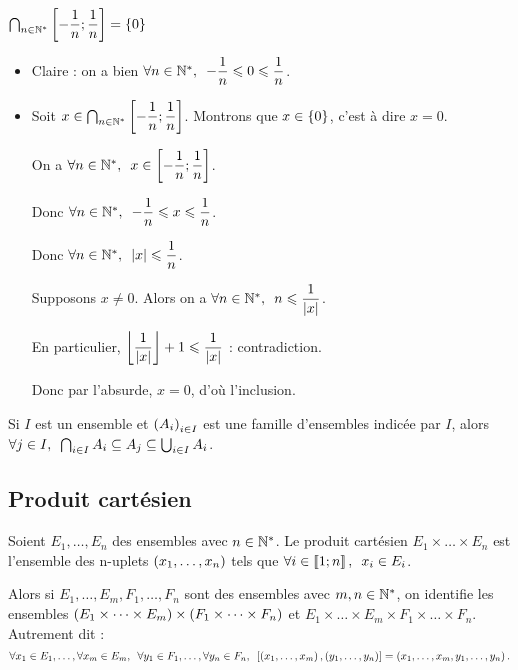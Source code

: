 \begin{ex}~\\
\(\bigcap_{n\in\mathbb{N}^*}\left[-\dfrac{1}{n};\dfrac{1}{n}\right]=\left\lbrace0\right\rbrace\)
\end{ex}

\begin{dem}
\begin{itemize}
\item[\increc] Claire : on a bien \(\quantifs{\forall n\in\Ns}-\dfrac{1}{n}\leq0\leq\dfrac{1}{n}\).

\item[\incdir] Soit \(x\in\bigcap_{n\in\mathbb{N}^*}\left[-\dfrac{1}{n};\dfrac{1}{n}\right]\). Montrons que \(x\in\left\lbrace0\right\rbrace\), c'est à dire \(x=0\).

On a \(\quantifs{\forall n\in\Ns}x\in\intervii{-\dfrac{1}{n}}{\dfrac{1}{n}}\).

Donc \(\quantifs{\forall n\in\Ns}-\dfrac{1}{n}\leq x\leq\dfrac{1}{n}\).

Donc \(\quantifs{\forall n\in\Ns}\abs{x}\leq\dfrac{1}{n}\).

Supposons \(x\not=0\). Alors on a \(\quantifs{\forall n\in\Ns}n\leq\dfrac{1}{\abs{x}}\).

En particulier, \(\left\lfloor\dfrac{1}{\left\lvert x\right\rvert}\right\rfloor+1\leqslant\dfrac{1}{\left\lvert x\right\rvert}\) : contradiction.

Donc par l'absurde, \(x=0\), d'où l'inclusion.
\end{itemize}
\end{dem}

\begin{rem}
Si \(I\) est un ensemble et \(\left(A_i\right)_{i\in I}\) est une famille d'ensembles indicée par \(I\), alors \(\quantifs{\forall j\in I}\biginter_{i\in I}A_i\subset A_j\subset\bigunion_{i\in I}A_i\).
\end{rem}

\subsection{Produit cartésien}

\begin{rappel}
Soient \(E_1,\dots,E_n\) des ensembles avec \(n\in\mathbb{N}^*\). Le produit cartésien \(E_1\times\dots\times E_n\) est l'ensemble des n-uplets \(\left(x_1,\dots,x_n\right)\) tels que \(\quantifs{\forall i\in\interventierii{1}{n}}x_i\in E_i\).

Alors si \(E_1,\dots,E_m,F_1,\dots,F_n\) sont des ensembles avec \(m,n\in\mathbb{N}^*\), on identifie les ensembles \(\left(E_1\times\dots\times E_m\right)\times\left(F_1\times\dots\times F_n\right)\) et \(E_1\times\dots\times E_m\times F_1\times\dots\times F_n\). Autrement dit : \[\quantifs{\forall x_1\in E_1,\dots,\forall x_m\in E_m;\forall y_1\in F_1,\dots,\forall y_n\in F_n}\croch{\paren{x_1,\dots,x_m},\paren{y_1,\dots,y_n}}=\paren{x_1,\dots,x_m,y_1,\dots,y_n}.\]
\end{rappel}

